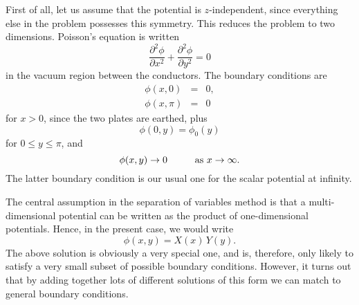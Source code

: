 First of all, let us assume that the potential is $z$-independent, since everything else
in the problem possesses this symmetry. This reduces the problem to two dimensions. 
Poisson's equation is written
\begin{equation}\label{e5.156}
\frac{\partial^2\phi}{\partial x^2} + \frac{\partial^2\phi}{\partial y^2} = 0
\end{equation}
in the vacuum region between the conductors. The boundary conditions are
\begin{eqnarray}
\phi(x, 0) &=& 0,\label{e5.157a}\\[0.5ex]
\phi(x, \pi)&=& 0\label{e5.157b}
\end{eqnarray}
for $x>0$, since the two plates are earthed, plus
\begin{equation}\label{e5.159}
\phi(0, y) = \phi_0(y)
\end{equation}
for $0\leq y \leq \pi$, and
\begin{equation}\label{e5.160}
\phi(x, y)\rightarrow 0\mbox{\hspace{1cm}as $x\rightarrow\infty$.}
\end{equation}
The latter boundary condition is our usual one for the
scalar potential at infinity.

The central assumption in the separation of variables method is that a 
multi-dimensional potential can be written as the product of one-dimensional
potentials. Hence, in the present case, we would write
\begin{equation}\label{e5.160a}
\phi(x, y) = X(x)\, Y(y).
\end{equation}
The above solution is obviously a very special one, and
is, therefore,  only likely to satisfy a very small subset of possible
boundary conditions. However, it turns out that by adding together
lots of different solutions of this form we can match to general boundary
conditions. 


